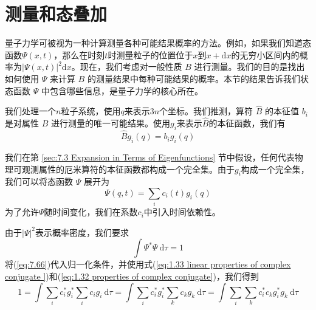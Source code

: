 \section{测量和态叠加}
\label{sec:7.6 Measurement and the Superposition of States}
    量子力学可被视为一种计算测量各种可能结果概率的方法。例如，如果我们知道态函数$\Psi\left(x,t\right)$，那么在时刻$t$时测量粒子的位置位于$x$到$x+\mathrm{d}x$的无穷小区间内的概率为$\left|\Psi\left(x,t\right)\right|^2\mathrm{d}x$。现在，我们考虑对一般性质 $B$ 进行测量。我们的目的是找出如何使用 $\Psi$ 来计算 $B$ 的测量结果中每种可能结果的概率。本节的结果告诉我们状态函数 $\Psi$ 中包含哪些信息，是量子力学的核心所在。

    我们处理一个$n$粒子系统，使用$q$来表示$3n$个坐标。我们推测，算符 $\hat{B}$ 的本征值 $b_i$ 是对属性 $B$ 进行测量的唯一可能结果。使用$g_i$来表示$\hat{B}$的本征函数，我们有
    \begin{equation}
        \hat{B}g_i\left(q\right) = b_ig_i\left(q\right)
        \label{eq:7.65}
    \end{equation}

    我们在第 \ref{sec:7.3 Expansion in Terms of Eigenfunctions} 节中假设，任何代表物理可观测属性的厄米算符的本征函数都构成一个完全集。由于$g_i$构成一个完全集，我们可以将态函数 $\Psi$ 展开为
    \begin{equation}
        \Psi\left(q,t\right) = \sum_{i}c_i\left(t\right)g_i\left(q\right)
        \label{eq:7.66}
    \end{equation}
    为了允许$\Psi$随时间变化，我们在系数$c_i$中引入时间依赖性。

    由于$\left|\Psi\right|^2$表示概率密度，我们要求
    \begin{equation}
        \int\Psi^{\ast}\Psi \:\mathrm{d}\tau = 1
        \label{eq:7.67}
    \end{equation}
    将(\ref{eq:7.66})代入归一化条件，并使用式(\ref{eq:1.33 linear properties of complex conjugate })和(\ref{eq:1.32 properties of complex conjugate})，我们得到
    \begin{equation}
        1 = \int \sum_{i}c_i^{\ast}g_i^{\ast}\sum_ic_ig_i\:\mathrm{d}\tau = \int\sum_{i}c_i^{\ast}g_i^{\ast}\sum_kc_kg_k \:\mathrm{d}\tau = \int\sum_{i}\sum_{k}c_i^{\ast}c_k g_i^{\ast}g_k\:\mathrm{d}\tau
        \label{eq:7.68}
    \end{equation}

